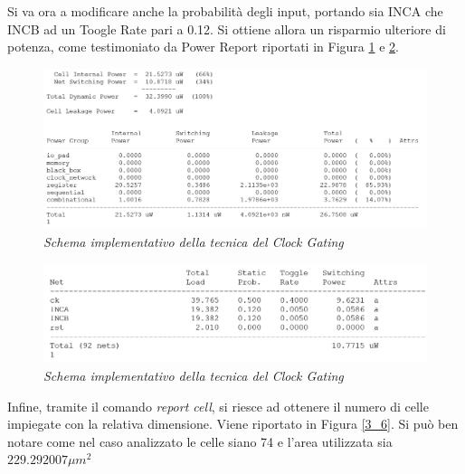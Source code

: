Si va ora a modificare anche la probabilità degli input, portando sia INCA che INCB ad un Toogle Rate pari a 0.12. Si ottiene allora un risparmio ulteriore di potenza, come testimoniato da Power Report riportati in Figura \ref{3_4} e \ref{3_5}.
\begin{figure}[!htb]
	\centering
	\includegraphics[scale=0.8]{immagini/3_4}
	\caption{\textit{Schema implementativo della tecnica del Clock Gating}}
	\label{3_4}
\end{figure}
\begin{figure}[!htb]
	\centering
	\includegraphics[scale=0.8]{immagini/3_5}
	\caption{\textit{Schema implementativo della tecnica del Clock Gating}}
	\label{3_5}
\end{figure}
\newpage
\noindent Infine, tramite il comando \textit{report cell}, si riesce ad ottenere il numero di celle impiegate con la relativa dimensione. Viene riportato in Figura \ref{3_6}. Si può ben notare come nel caso analizzato le celle siano 74 e l'area utilizzata sia $229.292007 \mu m^{2}$ \\
